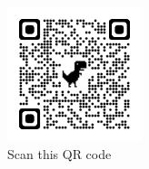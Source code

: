 \begin{figure}[h]
    \centering
    \includegraphics[width=0.35\textwidth]{images/qrcode.png}
    \caption*{Scan this QR code}
    \label{fig:figure3}
\end{figure}
